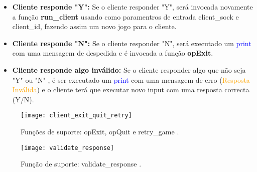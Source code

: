 \begin{itemize}
	\begin{itemize}
		\item\textbf{{Cliente responde "Y":}} Se o cliente responder "Y", será invocada novamente a função \textbf{run\_client} usando como paramentros de entrada client\_sock e client\_id, fazendo assim um novo jogo para o cliente.
		\item\textbf{{Cliente responde "N":}} Se o cliente responder "N", será executado um \textcolor{blue}{print} com uma mensagem de despedida e é invocada a função \textbf{opExit}.
		\item\textbf{{Cliente responde algo inválido:}} Se o cliente responder algo que não seja "Y" ou "N" , é ser executado um \textcolor{blue}{print} com uma mensagem de erro (\textcolor{orange}{Resposta Inválida}) e o cliente terá que executar novo input com uma resposta correcta (Y/N).
	\end{itemize}
\end{itemize}	


\begin{figure}[H]
	\centering
	\texttt{[image: client\_exit\_quit\_retry]}
	\caption{Funções de suporte: opExit, opQuit e retry\_game .\\}
	\label{fig:client_exit_quit_retry}
\end{figure} 
\begin{figure}[H]
	\centering
	\texttt{[image: validate\_response]}
	\caption{Função de suporte: validate\_response .\\}
	\label{fig:validate_response}
\end{figure} 

